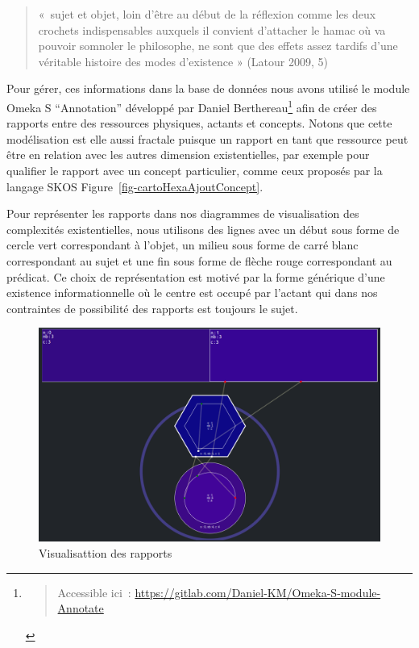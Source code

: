 \documentclass[
  letterpaper,
  DIV=11,
  numbers=noendperiod]{scrreprt}
\begin{document}
\begin{quote}
«~sujet et objet, loin d'être au début de la réflexion comme les deux
crochets indispensables auxquels il convient d'attacher le hamac où va
pouvoir somnoler le philosophe, ne sont que des effets assez tardifs
d'une véritable histoire des modes d'existence » (Latour 2009, 5)
\end{quote}

Pour gérer, ces informations dans la base de données nous avons utilisé
le module Omeka S ``Annotation'' développé par Daniel
Berthereau\footnote{\begin{quote}
  Accessible ici~:
  \url{https://gitlab.com/Daniel-KM/Omeka-S-module-Annotate}
  \end{quote}} afin de créer des rapports entre des ressources
physiques, actants et concepts. Notons que cette modélisation est elle
aussi fractale puisque un rapport en tant que ressource peut être en
relation avec les autres dimension existentielles, par exemple pour
qualifier le rapport avec un concept particulier, comme ceux proposés
par la langage SKOS Figure~\ref{fig-cartoHexaAjoutConcept}.

Pour représenter les rapports dans nos diagrammes de visualisation des
complexités existentielles, nous utilisons des lignes avec un début sous
forme de cercle vert correspondant à l'objet, un milieu sous forme de
carré blanc correspondant au sujet et une fin sous forme de flèche rouge
correspondant au prédicat. Ce choix de représentation est motivé par la
forme générique d'une existence informationnelle où le centre est occupé
par l'actant qui dans nos contraintes de possibilité des rapports est
toujours le sujet.

\begin{figure}

{\centering \includegraphics{images/localhost_samszo_HDR_jdcComplexityDiagramme.html.png}

}

\caption{\label{fig-datavizRapport}Visualisattion des rapports}

\end{figure}
\end{document}
